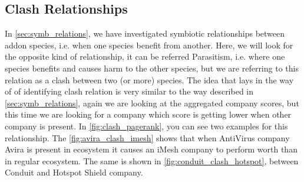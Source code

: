 \documentclass[11pt,oneside]{book}
\let\Oldsubsection\subsection
\renewcommand{\subsection}{\FloatBarrier\Oldsubsection}
\begin{document}
{{{{\subsection{Clash Relationships}
\label{sec:clash_relations}

In \autoref{sec:symb_relations}, we have investigated symbiotic relationships between addon species, i.e. when one species benefit from another. Here, we will look for the opposite kind of relationship, it can be referred Parasitism, i.e. where one species benefits and causes harm to the other species, but we are referring to this relation as a clash between two (or more) species. The idea that lays in the way of of identifying clash relation is very similar to the way described in \autoref{sec:symb_relations}, again we are looking at the aggregated company scores, but this time we are looking for a company which score is getting lower when other company is present. In \autoref{fig:clash_pagerank}, you can see two examples for this relationship. The \autoref{fig:avira_clash_imesh} shows that when AntiVirus company Avira is present in ecosystem it causes an iMesh company to perform worth than in regular ecosystem. The same is shown in \autoref{fig:conduit_clash_hotspot}, between Conduit and Hotspot Shield company.

}}}}
\end{document}
